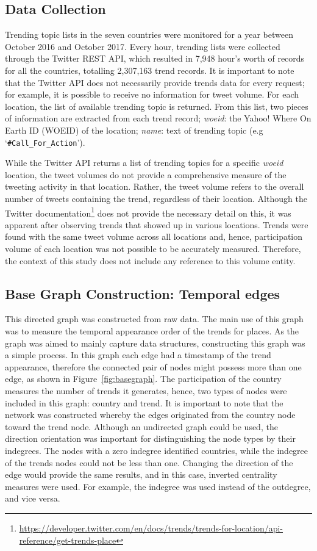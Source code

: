 \documentclass[conference]{IEEEtran}
\begin{document}
\subsection{Data Collection}

Trending topic lists in the seven countries were monitored for a year
between October 2016 and October 2017. Every hour, trending lists were
collected through the Twitter REST API, which resulted in 7,948 hour's
worth of records for all the countries, totalling 2,307,163 trend
records. It is important to note that the Twitter API does not
necessarily provide trends data for every request; for example, it is
possible to receive no information for tweet volume. For each
location, the list of available trending topic is returned. From this
list, two pieces of information are extracted from each trend record;
{\emph{woeid}}: the Yahoo! Where On Earth ID (WOEID) of the location;
{\emph{name}}: text of trending topic (e.g
`{\texttt{\#Call\_For\_Action}}').


While the Twitter API returns a list of trending topics for a specific
{\emph{woeid}} location, the tweet volumes do not provide a
comprehensive measure of the tweeting activity in that
location. Rather, the tweet volume refers to the overall number of
tweets containing the trend, regardless of their location. Although
the Twitter
documentation\footnote{\url{https://developer.twitter.com/en/docs/trends/trends-for-location/api-reference/get-trends-place}}
does not provide the necessary detail on this, it was apparent after
observing trends that showed up in various locations. Trends were
found with the same tweet volume across all locations and, hence,
participation volume of each location was not possible to be
accurately measured. Therefore, the context of this study does not
include any reference to this volume entity.

\subsection{Base Graph Construction: Temporal edges}

This directed graph was constructed from raw data. The main use of this graph was to measure the temporal appearance order of the trends for places. As the graph was aimed to mainly capture data structures, constructing this graph was a simple process.
In this graph each edge had a timestamp of the trend appearance, therefore the connected pair of nodes might possess more than one edge, as shown in Figure~\ref{fig:basegraph}. The participation of the country measures the number of trends it generates, hence, two types of nodes were included in this graph: country and trend. It is important to note that the network was constructed whereby the edges originated from the country node toward the trend node. Although an undirected graph could be used, the direction orientation was important for distinguishing the node types by their indegrees. The nodes with a zero indegree identified countries, while the indegree of the trends nodes could not be less than one. Changing the direction of the edge would provide the same results, and in this case, inverted centrality measures were used. For example, the indegree was used instead of the outdegree, and vice versa. 
\end{document}
